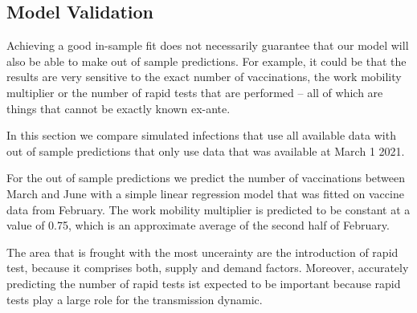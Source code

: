 \subsection{Model Validation}
\label{subsec:model_validation}

Achieving a good in-sample fit does not necessarily guarantee that our model will also
be able to make out of sample predictions. For example, it could be that the results
are very sensitive to the exact number of vaccinations, the work mobility multiplier
or the number of rapid tests that are performed -- all of which are things that cannot
be exactly known ex-ante.

In this section we compare simulated infections that use all available data with
out of sample predictions that only use data that was available at March 1 2021.

For the out of sample predictions we predict the number of vaccinations between March
and June with a simple linear regression model that was fitted on vaccine data from
February. The work mobility multiplier is predicted to be constant at a value of
0.75, which is an approximate average of the second half of February.

The area that is frought with the most uncerainty are the introduction of rapid test,
because it comprises both, supply and demand factors. Moreover, accurately predicting
the number of rapid tests ist expected to be important because rapid tests play a large
role for the transmission dynamic.




